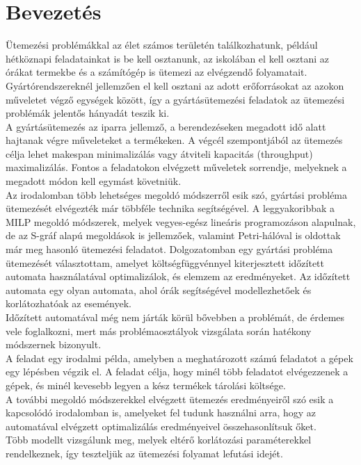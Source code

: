\documentclass [12pt]{report}
\begin{document}


\tableofcontents
\chapter{Bevezetés}
Ütemezési problémákkal az élet számos területén találkozhatunk, például hétköznapi feladatainkat is be kell osztanunk, az iskolában el kell osztani az órákat termekbe és a számítógép is ütemezi az elvégzendő folyamatait. Gyártórendszereknél jellemzően el kell osztani az adott erőforrásokat az azokon műveletet végző egységek között, így a gyártásütemezési feladatok az ütemezési problémák jelentős hányadát teszik ki. \\
A gyártásütemezés az iparra jellemző, a berendezéseken megadott idő alatt hajtanak végre műveleteket a termékeken. A végcél szempontjából az ütemezés célja lehet makespan minimalizálás vagy átviteli kapacitás (throughput) maximalizálás. Fontos a feladatokon elvégzett műveletek sorrendje, melyeknek a megadott módon kell egymást követniük.\\
Az irodalomban több lehetséges megoldó módszerről esik szó, gyártási probléma ütemezését elvégezték már többféle technika segítségével. A leggyakoribbak a MILP megoldó módszerek, melyek vegyes-egész lineáris programozáson alapulnak, de az S-gráf alapú megoldások is jellemzőek, valamint Petri-hálóval is oldottak már meg hasonló ütemezési feladatot.
Dolgozatomban egy gyártási probléma ütemezését választottam, amelyet költségfüggvénnyel kiterjesztett időzített automata használatával optimalizálok, és elemzem az eredményeket. Az időzített automata egy olyan automata, ahol órák segítségével modellezhetőek és korlátozhatóak az események.\\
Időzített automatával még nem járták körül bővebben a problémát, de érdemes vele foglalkozni, mert más problémaosztályok vizsgálata során hatékony módszernek bizonyult.\\
A feladat egy irodalmi példa, amelyben a meghatározott számú feladatot a gépek egy lépésben végzik el.
A feladat célja, hogy minél több feladatot elvégezzenek a gépek, és minél kevesebb legyen a kész termékek tárolási költsége.\\
A további megoldó módszerekkel elvégzett ütemezés eredményeiről szó esik a kapcsolódó irodalomban is, amelyeket fel tudunk használni arra, hogy az automatával elvégzett optimalizálás eredményeivel összehasonlítsuk őket. \\
Több modellt vizsgálunk meg, melyek eltérő korlátozási paraméterekkel rendelkeznek, így teszteljük az ütemezési folyamat lefutási idejét.
\end{document}
